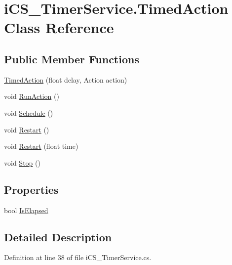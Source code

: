 \hypertarget{classi_c_s___timer_service_1_1_timed_action}{\section{i\+C\+S\+\_\+\+Timer\+Service.\+Timed\+Action Class Reference}
\label{classi_c_s___timer_service_1_1_timed_action}
}
\subsection*{Public Member Functions}
\begin{DoxyCompactItemize}
\item 
\hyperlink{classi_c_s___timer_service_1_1_timed_action_a25f072e912c1084e3c7f6f98ed874fd3}{Timed\+Action} (float delay, Action action)
\item 
void \hyperlink{classi_c_s___timer_service_1_1_timed_action_a10feefad16585ce3031a04247c51a91f}{Run\+Action} ()
\item 
void \hyperlink{classi_c_s___timer_service_1_1_timed_action_aa0523707b10548d09c1f702ac48bd3ee}{Schedule} ()
\item 
void \hyperlink{classi_c_s___timer_service_1_1_timed_action_a2029b415b959324cde9e514c9d943d8d}{Restart} ()
\item 
void \hyperlink{classi_c_s___timer_service_1_1_timed_action_aaf76e9a03f8aea3ed32581fbd10310a5}{Restart} (float time)
\item 
void \hyperlink{classi_c_s___timer_service_1_1_timed_action_aa8df8e8c07d318d4fa8f1980815bb98e}{Stop} ()
\end{DoxyCompactItemize}
\subsection*{Properties}
\begin{DoxyCompactItemize}
\item 
bool \hyperlink{classi_c_s___timer_service_1_1_timed_action_ae60466edb67e68cffa3b8504bc260f9f}{Is\+Elapsed}
\end{DoxyCompactItemize}


\subsection{Detailed Description}


Definition at line 38 of file i\+C\+S\+\_\+\+Timer\+Service.\+cs.



